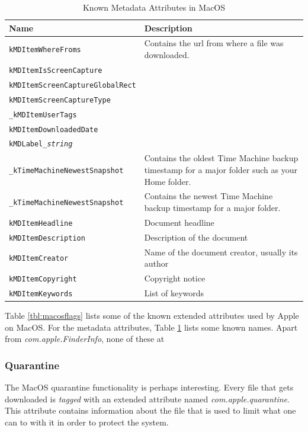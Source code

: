 \documentclass[a4paper]{article}
\begin{document}


\begin{table}
\centering
\caption{Known Metadata Attributes in MacOS}
\label{tbl:macosmetaattr}
\begin{tabular}{@{}lp{6cm}@{}}
\toprule
Name & Description\\
\midrule
\texttt{kMDItemWhereFroms} & Contains the \gls{url} from where a file was downloaded.\\
\texttt{kMDItemIsScreenCapture} & \\
\texttt{kMDItemScreenCaptureGlobalRect} & \\
\texttt{kMDItemScreenCaptureType} & \\
\texttt{\_kMDItemUserTags} & \\
\texttt{kMDItemDownloadedDate} & \\
\texttt{kMDLabel\_\emph{string}} & \\
\texttt{\_kTimeMachineNewestSnapshot} & Contains the oldest Time Machine backup timestamp for a major folder such as your Home folder.\\
\texttt{\_kTimeMachineNewestSnapshot} & Contains the newest Time Machine backup timestamp for a major folder.\\
\texttt{kMDItemHeadline} & Document headline\\
\texttt{kMDItemDescription} & Description of the document\\
\texttt{kMDItemCreator} & Name of the document creator, usually its author\\
\texttt{kMDItemCopyright} & Copyright notice\\
\texttt{kMDItemKeywords} &  List of keywords\\
\bottomrule
\end{tabular}
\end{table}

Table \ref{tbl:macosflags} lists some of the known extended attributes used by Apple on MacOS. For the metadata attributes, Table \ref{tbl:macosmetaattr} lists some known names. Apart from \emph{com.apple.FinderInfo}, none of these at

\subsubsection{Quarantine}

The MacOS quarantine functionality is perhaps interesting. Every file that gets downloaded is \emph{tagged} with an extended attribute named \emph{com.apple.quarantine}. This attribute contains information about the file that is used to limit what one can to with it in order to protect the system.
\end{document}
